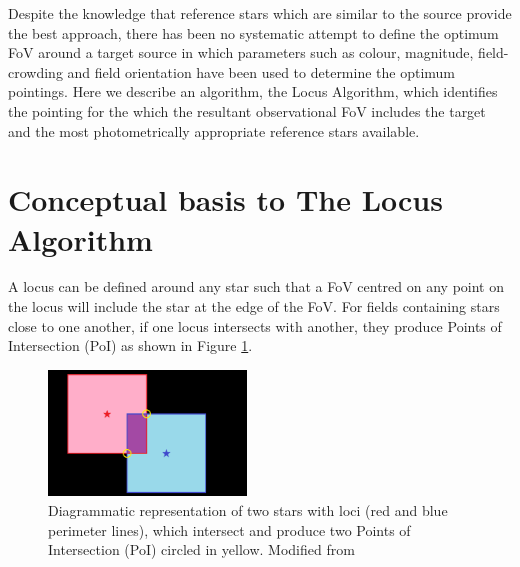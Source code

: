 \documentclass[referee]{aa}
\begin{document}
Despite the knowledge that reference stars which are similar to the source provide the best approach, there has been no systematic attempt to define the optimum FoV around a target source in which parameters such as colour, magnitude, field-crowding and field orientation have been used to determine the optimum pointings. Here we describe an algorithm, the Locus Algorithm, which identifies the pointing for the which the resultant observational FoV includes the target and the most photometrically appropriate reference stars available.

%


\section{Conceptual basis to The Locus Algorithm}
\label{conceptual-basis-to-the-locus-algorithm}

A locus can be defined around any star such that a FoV centred on any
point on the locus will include the star at the edge of the FoV. For
fields containing stars close to one another, if one locus intersects
with another, they produce Points of Intersection (PoI) as shown in Figure \ref{loci_concept}.

\begin{figure}[!htb]
\centering
\includegraphics[width=0.47\textwidth]{fig1.png}
\caption{\label{loci_concept}Diagrammatic representation of two stars with loci
(red and blue perimeter lines), which intersect and produce two Points
of Intersection (PoI) circled in yellow.  Modified from \citet{creaner2016thesis}}
\end{figure}
\end{document}

